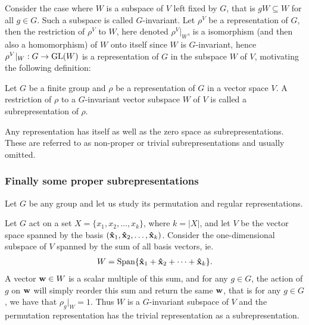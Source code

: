 Consider the case where $W$ is a subspace of $V$ left fixed by $G$, that is $gW \subseteq W$ for all $g \in G$. Such a subspace is called $G$-invariant. Let $\rho^V$ be a representation of $G$, then the restriction of $\rho^V$ to $W$, here denoted $\rho^V|_W$, is a isomorphism (and then also a homomorphism) of $W$ onto itself since $W$ is $G$-invariant, hence $\rho^V|_W: G \rightarrow \text{GL}(W)$ is a representation of $G$ in the subspace $W$ of $V$, motivating the following definition:

\begin{definition}[Subrepresentation]\label{def:subrepr}
	Let $G$ be a finite group and $\rho$ be a representation of $G$ in a vector space $V$. A restriction of $\rho$ to a $G$-invariant vector subspace $W$ of $V$ is called a subrepresentation of $\rho$.
\end{definition}


\begin{example}
	Any representation has itself as well as the zero space as subrepresentations. These are referred to as non-proper or trivial subrepresentations and usually omitted.
\end{example}

\subsubsection{Finally some proper subrepresentations}

Let $G$ be any group and let us study its permutation and regular representations. 

\begin{example}\cite[Example 1.4.3.]{Sagan}\label{example:trivpermrepr}
	Let $G$ act on a set $X = \{x_1, x_2, \dots, x_k\}$, where $k = |X|$, and let $V$ be the vector space spanned by the basis $(\mathbf{\hat{x}}_1, \mathbf{\hat{x}}_2, \dots, \mathbf{\hat{x}}_k)$. Consider the one-dimensional subspace of $V$ spanned by the sum of all basis vectors, ie. 
	\begin{align*}	
		W = \text{Span}\{ \mathbf{\hat{x}}_1 + \mathbf{\hat{x}}_2 + \dots + \mathbf{\hat{x}}_k \}.
	\end{align*}A vector $\mathbf{w} \in W$ is a scalar multiple of this sum, and for any $g \in G$, the action of $g$ on $\mathbf{w}$ will simply reorder this sum and return the same $\mathbf{w}$, that is for any $g \in G$, we have that $\rho_g|_W = 1$. Thus $W$ is a $G$-invariant subspace of $V$ and the permutation representation has the trivial representation as a subrepresentation.
\end{example}


